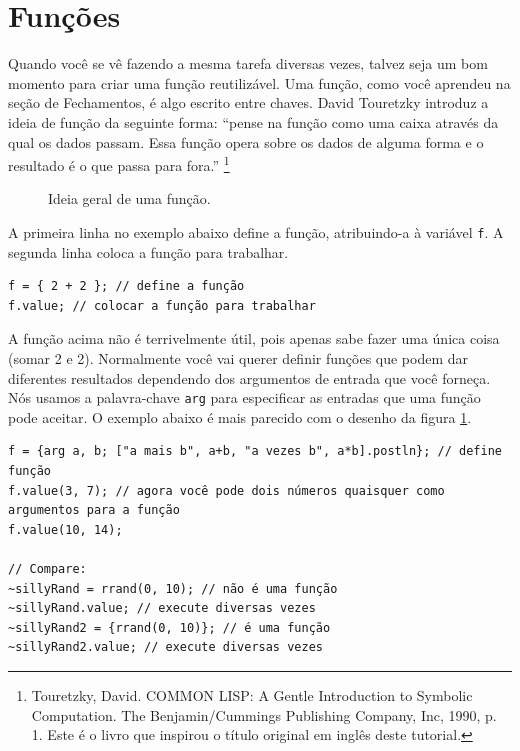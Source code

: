 \section{Funções}
\label{sec:functions}

Quando você se vê fazendo a mesma tarefa diversas vezes, talvez seja um bom momento para criar uma função reutilizável. Uma função, como você aprendeu na seção de Fechamentos, é algo escrito entre chaves. David Touretzky introduz a ideia de função da seguinte forma: “pense na função como uma caixa através da qual os dados passam. Essa função opera sobre os dados de alguma forma e o resultado é o que passa para fora.” \footnote{Touretzky, David. COMMON LISP: A Gentle Introduction to Symbolic Computation. The Benjamin/Cummings Publishing Company, Inc, 1990, p. 1. Este é o livro que inspirou o título original em inglês deste tutorial.}

\begin{figure}[h]
\centerline{}
\caption{Ideia geral de uma função.}
\label{fig:function-box}
\end{figure}

A primeira linha no exemplo abaixo define a função, atribuindo-a à variável \texttt{f}. A segunda linha coloca a função para trabalhar.

 
\begin{lstlisting}[style=SuperCollider-IDE, basicstyle=\scttfamily\footnotesize]
f = { 2 + 2 }; // define a função
f.value; // colocar a função para trabalhar
\end{lstlisting}
 
A função acima não é terrivelmente útil, pois apenas sabe fazer uma única coisa (somar 2 e 2). Normalmente você vai querer definir funções que podem dar diferentes resultados dependendo dos argumentos de entrada que você forneça. Nós usamos a palavra-chave \texttt{arg} para especificar as entradas que uma função pode aceitar. O exemplo abaixo é mais parecido com o desenho da figura \ref{fig:function-box}.
 
\begin{lstlisting}[style=SuperCollider-IDE, basicstyle=\scttfamily\footnotesize]
f = {arg a, b; ["a mais b", a+b, "a vezes b", a*b].postln}; // define função
f.value(3, 7); // agora você pode dois números quaisquer como argumentos para a função
f.value(10, 14);

// Compare:
~sillyRand = rrand(0, 10); // não é uma função
~sillyRand.value; // execute diversas vezes
~sillyRand2 = {rrand(0, 10)}; // é uma função
~sillyRand2.value; // execute diversas vezes
\end{lstlisting}
 
